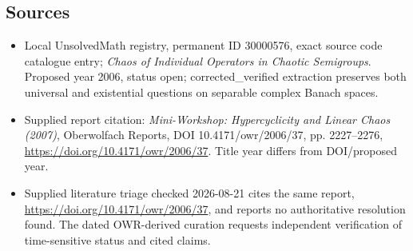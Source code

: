 \documentclass[11pt]{article}
\begin{document}
\subsection{Sources}
\begin{itemize}
\item Local UnsolvedMath registry, permanent ID 30000576, exact source code catalogue entry; \emph{Chaos of Individual Operators in Chaotic Semigroups}. Proposed year 2006, status open; corrected\_verified extraction preserves both universal and existential questions on separable complex Banach spaces.
\item Supplied report citation: \emph{Mini-Workshop: Hypercyclicity and Linear Chaos (2007)}, Oberwolfach Reports, DOI 10.4171/owr/2006/37, pp. 2227--2276, \url{https://doi.org/10.4171/owr/2006/37}. Title year differs from DOI/proposed year.
\item Supplied literature triage checked 2026-08-21 cites the same report, \url{https://doi.org/10.4171/owr/2006/37}, and reports no authoritative resolution found. The dated OWR-derived curation requests independent verification of time-sensitive status and cited claims.
\end{itemize}
\end{document}
